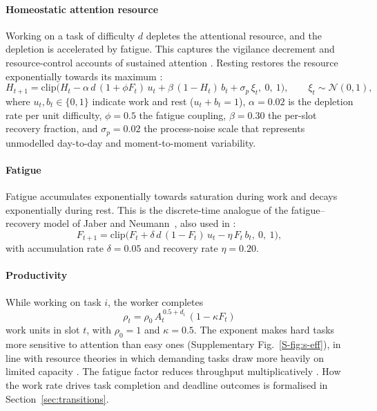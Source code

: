 \paragraph{Homeostatic attention resource}
Working on a task of difficulty $d$ depletes the attentional resource, and the depletion is accelerated by fatigue. This captures the vigilance decrement and resource-control accounts of sustained attention \cite{mackworth1948,warm2008,thomson2015}. Resting restores the resource exponentially towards its maximum \cite{ariga2011,albulescu2022}:
\begin{equation}
H_{t+1}=\mathrm{clip}\Big(H_t-\alpha\,d\,(1+\phi F_t)\,u_t+\beta\,(1-H_t)\,b_t+\sigma_p\,\xi_t,\ 0,\ 1\Big),\qquad \xi_t\sim\mathcal N(0,1),
\label{eq:H}
\end{equation}
where $u_t,b_t\in\{0,1\}$ indicate work and rest ($u_t+b_t=1$), $\alpha=0.02$ is the depletion rate per unit difficulty, $\phi=0.5$ the fatigue coupling, $\beta=0.30$ the per-slot recovery fraction, and $\sigma_p=0.02$ the process-noise scale that represents unmodelled day-to-day and moment-to-moment variability.

\paragraph{Fatigue}
Fatigue accumulates exponentially towards saturation during work and decays exponentially during rest. This is the discrete-time analogue of the fatigue--recovery model of Jaber and Neumann~\cite{jaber2010}, also used in \cite{jaber2013,givi2015}:
\begin{equation}
F_{t+1}=\mathrm{clip}\Big(F_t+\delta\,d\,(1-F_t)\,u_t-\eta\,F_t\,b_t,\ 0,\ 1\Big),
\label{eq:F}
\end{equation}
with accumulation rate $\delta=0.05$ and recovery rate $\eta=0.20$.

\paragraph{Productivity}
While working on task $i$, the worker completes
\begin{equation}
\rho_t=\rho_0\,A_t^{\,0.5+d_i}\,(1-\kappa F_t)
\label{eq:rho}
\end{equation}
work units in slot $t$, with $\rho_0=1$ and $\kappa=0.5$. The exponent makes hard tasks more sensitive to attention than easy ones (Supplementary Fig.~\ref{S-fig:s-eff}), in line with resource theories in which demanding tasks draw more heavily on limited capacity \cite{kahneman1973,wickens2008}. The fatigue factor reduces throughput multiplicatively \cite{boksem2008,hockey2013}. How the work rate drives task completion and deadline outcomes is formalised in Section~\ref{sec:transitions}.

